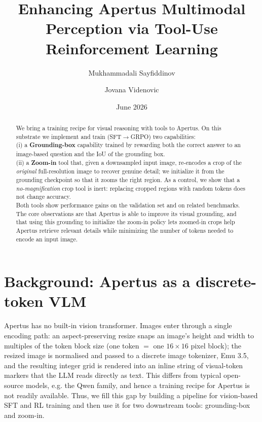 \documentclass[10pt,twocolumn]{article}
\title{\textbf{Enhancing Apertus Multimodal Perception via Tool-Use Reinforcement Learning}}
\author[1]{Mukhammadali Sayfiddinov}
\author[1]{Jovana Videnovic}
\affil[1]{Swiss AI Initiative, ETH Z\"urich}
\date{June 2026}
\begin{document}
\maketitle

\begin{abstract}
We bring a training recipe for visual reasoning with tools to Apertus. On this substrate we implement and train
(SFT$\rightarrow$GRPO) two capabilities: \\
(i) a \textbf{Grounding-box} capability trained by rewarding both the correct answer to an image-based question and the IoU of the grounding box. \\
(ii) a \textbf{Zoom-in} tool that, given a downsampled input image, re-encodes a crop of the \emph{original} full-resolution image to recover genuine detail; we initialize it from the grounding checkpoint so that it zooms the right region. As a control, we show that a \emph{no-magnification} crop tool is
inert: replacing cropped regions with random tokens does not change accuracy. \\
Both tools show performance gains on the validation set and on related benchmarks.
The core observations are that Apertus is able to improve its visual grounding, and that using this grounding to initialize the zoom-in policy lets zoomed-in crops help Apertus retrieve relevant details while minimizing the number of tokens needed to encode an input image.
\end{abstract}


\section*{Background: Apertus as a discrete-token VLM}
\label{sec:bg}

Apertus has no built-in vision transformer. Images enter through a single encoding path:
an aspect-preserving resize snaps an image's height and width to multiples of the
token block size (one token $=$ one $16\!\times\!16$ pixel block); the resized image is normalised and passed to a
discrete image tokenizer, Emu 3.5, and the resulting integer grid is rendered into an inline
string of visual-token markers that the LLM reads directly
as text. This differs from typical open-source models, e.g. the Qwen family, and hence a training recipe for Apertus is not readily available. Thus, we fill this gap by building a pipeline for vision-based SFT and RL training and then use it for two downstream tools: grounding-box and zoom-in.
\end{document}

